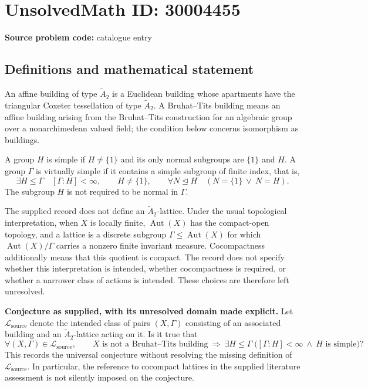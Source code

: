 \documentclass[11pt]{article}
\begin{document}
\section*{UnsolvedMath ID: 30004455}
\textbf{Source problem code:} catalogue entry
\subsection{Definitions and mathematical statement}
An affine building of type \(\widetilde A_2\) is a Euclidean building whose apartments have the triangular Coxeter tessellation of type \(\widetilde A_2\). A Bruhat--Tits building means an affine building arising from the Bruhat--Tits construction for an algebraic group over a nonarchimedean valued field; the condition below concerns isomorphism as buildings.

A group \(H\) is simple if \(H\ne\{1\}\) and its only normal subgroups are \(\{1\}\) and \(H\). A group \(\Gamma\) is virtually simple if it contains a simple subgroup of finite index, that is,
\[
\exists H\leq\Gamma\quad [\Gamma:H]<\infty,\qquad H\ne\{1\},\qquad
\forall N\trianglelefteq H\quad (N=\{1\}\ \lor\ N=H).
\]
The subgroup \(H\) is not required to be normal in \(\Gamma\).

The supplied record does not define an \(\widetilde A_2\)-lattice. Under the usual topological interpretation, when \(X\) is locally finite, \(\operatorname{Aut}(X)\) has the compact-open topology, and a lattice is a discrete subgroup \(\Gamma\leq\operatorname{Aut}(X)\) for which \(\operatorname{Aut}(X)/\Gamma\) carries a nonzero finite invariant measure. Cocompactness additionally means that this quotient is compact. The record does not specify whether this interpretation is intended, whether cocompactness is required, or whether a narrower class of actions is intended. These choices are therefore left unresolved.

\textbf{Conjecture as supplied, with its unresolved domain made explicit.} Let \(\mathcal L_{\mathrm{source}}\) denote the intended class of pairs \((X,\Gamma)\) consisting of an associated building and an \(\widetilde A_2\)-lattice acting on it. Is it true that
\[
\forall (X,\Gamma)\in\mathcal L_{\mathrm{source}},\qquad
X\text{ is not a Bruhat--Tits building}
\ \Longrightarrow\
\exists H\leq\Gamma\;
\bigl([\Gamma:H]<\infty\ \land\ H\text{ is simple}\bigr)?
\]
This records the universal conjecture without resolving the missing definition of \(\mathcal L_{\mathrm{source}}\). In particular, the reference to cocompact lattices in the supplied literature assessment is not silently imposed on the conjecture.
\end{document}
